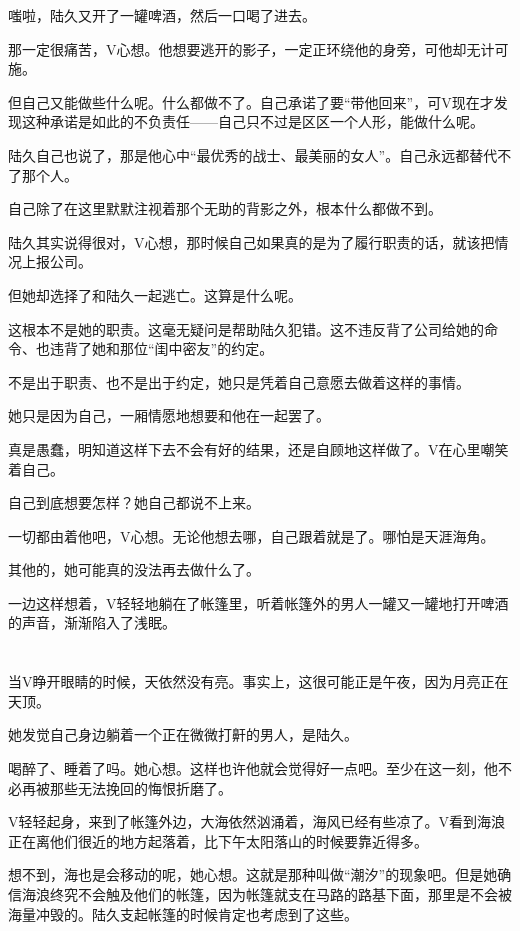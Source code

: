 嗤啦，陆久又开了一罐啤酒，然后一口喝了进去。

那一定很痛苦，V心想。他想要逃开的影子，一定正环绕他的身旁，可他却无计可施。

但自己又能做些什么呢。什么都做不了。自己承诺了要“带他回来”，可V现在才发现这种承诺是如此的不负责任——自己只不过是区区一个人形，能做什么呢。

陆久自己也说了，那是他心中“最优秀的战士、最美丽的女人”。自己永远都替代不了那个人。

自己除了在这里默默注视着那个无助的背影之外，根本什么都做不到。

陆久其实说得很对，V心想，那时候自己如果真的是为了履行职责的话，就该把情况上报公司。

但她却选择了和陆久一起逃亡。这算是什么呢。

这根本不是她的职责。这毫无疑问是帮助陆久犯错。这不违反背了公司给她的命令、也违背了她和那位“闺中密友”的约定。

不是出于职责、也不是出于约定，她只是凭着自己意愿去做着这样的事情。

她只是因为自己，一厢情愿地想要和他在一起罢了。

真是愚蠢，明知道这样下去不会有好的结果，还是自顾地这样做了。V在心里嘲笑着自己。

自己到底想要怎样？她自己都说不上来。

一切都由着他吧，V心想。无论他想去哪，自己跟着就是了。哪怕是天涯海角。

其他的，她可能真的没法再去做什么了。

一边这样想着，V轻轻地躺在了帐篷里，听着帐篷外的男人一罐又一罐地打开啤酒的声音，渐渐陷入了浅眠。

\section*{}

当V睁开眼睛的时候，天依然没有亮。事实上，这很可能正是午夜，因为月亮正在天顶。

她发觉自己身边躺着一个正在微微打鼾的男人，是陆久。

喝醉了、睡着了吗。她心想。这样也许他就会觉得好一点吧。至少在这一刻，他不必再被那些无法挽回的悔恨折磨了。

V轻轻起身，来到了帐篷外边，大海依然汹涌着，海风已经有些凉了。V看到海浪正在离他们很近的地方起落着，比下午太阳落山的时候要靠近得多。

想不到，海也是会移动的呢，她心想。这就是那种叫做“潮汐”的现象吧。但是她确信海浪终究不会触及他们的帐篷，因为帐篷就支在马路的路基下面，那里是不会被海量冲毁的。陆久支起帐篷的时候肯定也考虑到了这些。

